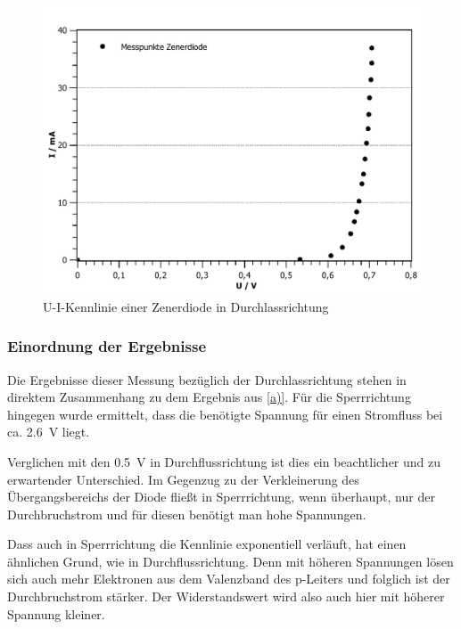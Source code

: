 \documentclass[11pt,a4paper,titlepage, ngerman]{article}
\begin{document}
\begin{itemize}
				 	\begin{figure}[ht]
				 		\centering
				 		\includegraphics[width=\textwidth]{KennlinieZenerdiodeDurchlassrichtung_2.pdf}
				 		\caption{U-I-Kennlinie einer Zenerdiode in Durchlassrichtung}
				 		\label{KL b2}
				 	\end{figure}
				 					 	
				\end{itemize}
											
			\subsubsection*{Einordnung der Ergebnisse}
				
				Die Ergebnisse dieser Messung bezüglich der Durchlassrichtung stehen in direktem Zusammenhang zu dem Ergebnis aus \ref{a)}. 
				Für die Sperrrichtung hingegen wurde ermittelt, dass die benötigte Spannung für einen Stromfluss bei ca. \SI{2.6}{\volt} liegt. 
				
				Verglichen mit den \SI{0.5}{\volt} in Durchflussrichtung ist dies ein beachtlicher und zu erwartender Unterschied.
				Im Gegenzug zu der Verkleinerung des Übergangsbereichs der Diode fließt in Sperrrichtung, wenn überhaupt, nur der Durchbruchstrom und für diesen benötigt man hohe Spannungen. 
				
				Dass auch in Sperrrichtung die Kennlinie exponentiell verläuft, hat einen ähnlichen Grund, wie in Durchflussrichtung.
				Denn mit höheren Spannungen lösen sich auch mehr Elektronen aus dem Valenzband des p-Leiters und folglich ist der Durchbruchstrom stärker.
				Der Widerstandswert wird also auch hier mit höherer Spannung kleiner. 
				
\end{document}
